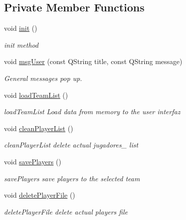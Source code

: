 \subsection*{Private Member Functions}
\begin{DoxyCompactItemize}
\item 
void \hyperlink{class_main_window_a671e7e5b0a3a7a3fb1cf44c5c8377952}{init} ()
\begin{DoxyCompactList}\small\item\em init method \end{DoxyCompactList}\item 
void \hyperlink{class_main_window_a9474f6768838e45603392694ae2c3913}{msg\+User} (const Q\+String title, const Q\+String message)
\begin{DoxyCompactList}\small\item\em General messages pop up. \end{DoxyCompactList}\item 
void \hyperlink{class_main_window_a79e5d5e87b7320205e162f7ba07a12a9}{load\+Team\+List} ()
\begin{DoxyCompactList}\small\item\em load\+Team\+List Load data from memory to the user interfaz \end{DoxyCompactList}\item 
void \hyperlink{class_main_window_ace14793517d02cd5d322190f6540b0ba}{clean\+Player\+List} ()
\begin{DoxyCompactList}\small\item\em clean\+Player\+List delete actual jugadores\+\_\+ list \end{DoxyCompactList}\item 
void \hyperlink{class_main_window_aff0a6c08ba9cb391b4c259d7e1e3e6ee}{save\+Players} ()
\begin{DoxyCompactList}\small\item\em save\+Players save players to the selected team \end{DoxyCompactList}\item 
void \hyperlink{class_main_window_a843575f69edeacfeecdaa5a3a4ef31fe}{delete\+Player\+File} ()
\begin{DoxyCompactList}\small\item\em delete\+Player\+File delete actual player\textquotesingle{}s file \end{DoxyCompactList}\end{DoxyCompactItemize}
